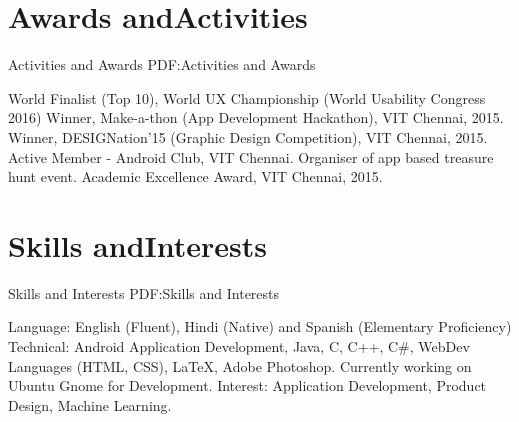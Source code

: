 \documentclass[letterpaper,10pt,oneside]{article}
\newcommand{\CVNote}{CV compiled on {\today} for MITACS}
\begin{document}
\begin{body}

\section
{Awards and\hfill \break Activities}
{Activities and Awards}
{PDF:Activities and Awards}

\BulletItem
World Finalist (Top 10), World UX Championship (World Usability Congress 2016) 
\BulletItem
Winner, Make-a-thon (App Development Hackathon), VIT Chennai, 2015.
\BulletItem
Winner, DESIGNation'15 (Graphic Design Competition), VIT Chennai, 2015.
\BulletItem
Active Member - Android Club, VIT Chennai. Organiser of app based treasure hunt event.
\BulletItem
Academic Excellence Award, VIT Chennai, 2015.


\section
{Skills and\hfill \break Interests}
{Skills and Interests}
{PDF:Skills and Interests}

\BulletItem
Language: English (Fluent), Hindi (Native) and Spanish (Elementary Proficiency) 
\BulletItem
Technical: Android Application Development, Java, C, C++, C\#, WebDev Languages (HTML, CSS), {\LaTeX}, Adobe Photoshop. Currently working on Ubuntu Gnome for Development.   
\BulletItem
Interest: Application Development, Product Design, Machine Learning.

\end{body}


\begin{flushright}
\UseNoteFont%
\end{flushright}

\label{LastPage}~
\end{document}
